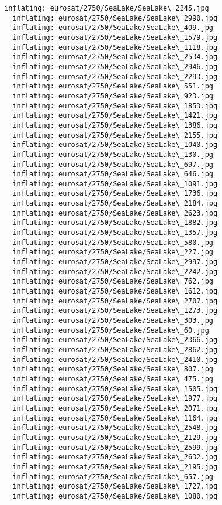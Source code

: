 \documentclass[11pt]{article}
\begin{document}
\begin{Verbatim}[commandchars=\\\{\}]
  inflating: eurosat/2750/SeaLake/SeaLake\_2245.jpg
  inflating: eurosat/2750/SeaLake/SeaLake\_2990.jpg
  inflating: eurosat/2750/SeaLake/SeaLake\_409.jpg
  inflating: eurosat/2750/SeaLake/SeaLake\_1579.jpg
  inflating: eurosat/2750/SeaLake/SeaLake\_1118.jpg
  inflating: eurosat/2750/SeaLake/SeaLake\_2534.jpg
  inflating: eurosat/2750/SeaLake/SeaLake\_2946.jpg
  inflating: eurosat/2750/SeaLake/SeaLake\_2293.jpg
  inflating: eurosat/2750/SeaLake/SeaLake\_551.jpg
  inflating: eurosat/2750/SeaLake/SeaLake\_923.jpg
  inflating: eurosat/2750/SeaLake/SeaLake\_1853.jpg
  inflating: eurosat/2750/SeaLake/SeaLake\_1421.jpg
  inflating: eurosat/2750/SeaLake/SeaLake\_1386.jpg
  inflating: eurosat/2750/SeaLake/SeaLake\_2155.jpg
  inflating: eurosat/2750/SeaLake/SeaLake\_1040.jpg
  inflating: eurosat/2750/SeaLake/SeaLake\_130.jpg
  inflating: eurosat/2750/SeaLake/SeaLake\_697.jpg
  inflating: eurosat/2750/SeaLake/SeaLake\_646.jpg
  inflating: eurosat/2750/SeaLake/SeaLake\_1091.jpg
  inflating: eurosat/2750/SeaLake/SeaLake\_1736.jpg
  inflating: eurosat/2750/SeaLake/SeaLake\_2184.jpg
  inflating: eurosat/2750/SeaLake/SeaLake\_2623.jpg
  inflating: eurosat/2750/SeaLake/SeaLake\_1882.jpg
  inflating: eurosat/2750/SeaLake/SeaLake\_1357.jpg
  inflating: eurosat/2750/SeaLake/SeaLake\_580.jpg
  inflating: eurosat/2750/SeaLake/SeaLake\_227.jpg
  inflating: eurosat/2750/SeaLake/SeaLake\_2997.jpg
  inflating: eurosat/2750/SeaLake/SeaLake\_2242.jpg
  inflating: eurosat/2750/SeaLake/SeaLake\_762.jpg
  inflating: eurosat/2750/SeaLake/SeaLake\_1612.jpg
  inflating: eurosat/2750/SeaLake/SeaLake\_2707.jpg
  inflating: eurosat/2750/SeaLake/SeaLake\_1273.jpg
  inflating: eurosat/2750/SeaLake/SeaLake\_303.jpg
  inflating: eurosat/2750/SeaLake/SeaLake\_60.jpg
  inflating: eurosat/2750/SeaLake/SeaLake\_2366.jpg
  inflating: eurosat/2750/SeaLake/SeaLake\_2862.jpg
  inflating: eurosat/2750/SeaLake/SeaLake\_2410.jpg
  inflating: eurosat/2750/SeaLake/SeaLake\_807.jpg
  inflating: eurosat/2750/SeaLake/SeaLake\_475.jpg
  inflating: eurosat/2750/SeaLake/SeaLake\_1505.jpg
  inflating: eurosat/2750/SeaLake/SeaLake\_1977.jpg
  inflating: eurosat/2750/SeaLake/SeaLake\_2071.jpg
  inflating: eurosat/2750/SeaLake/SeaLake\_1164.jpg
  inflating: eurosat/2750/SeaLake/SeaLake\_2548.jpg
  inflating: eurosat/2750/SeaLake/SeaLake\_2129.jpg
  inflating: eurosat/2750/SeaLake/SeaLake\_2599.jpg
  inflating: eurosat/2750/SeaLake/SeaLake\_2632.jpg
  inflating: eurosat/2750/SeaLake/SeaLake\_2195.jpg
  inflating: eurosat/2750/SeaLake/SeaLake\_657.jpg
  inflating: eurosat/2750/SeaLake/SeaLake\_1727.jpg
  inflating: eurosat/2750/SeaLake/SeaLake\_1080.jpg

\end{Verbatim}
\end{document}
